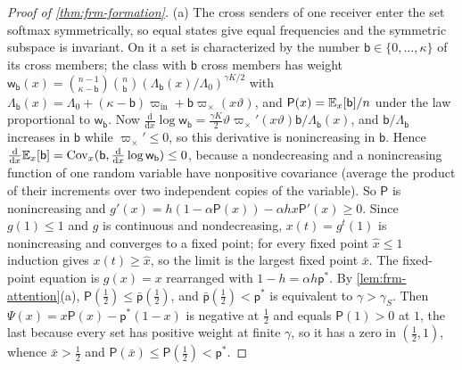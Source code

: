 \begin{proof}[Proof of \cref{thm:frm-formation}]
(a) The cross senders of one receiver enter the set softmax symmetrically, so equal states give equal frequencies and the symmetric subspace is invariant. On it a set is characterized by the number $\mathsf b\in\{0,\dots,\kappa\}$ of its cross members; the class with $\mathsf b$ cross members has weight $\mathsf w_{\mathsf b}(x)=\binom{n-1}{\kappa-\mathsf b}\binom n{\mathsf b}(\Lambda_{\mathsf b}(x)/\Lambda_0)^{\gamma K/2}$ with $\Lambda_{\mathsf b}(x)=\Lambda_0+(\kappa-\mathsf b)\varpi_{\mathrm{in}}+\mathsf b\varpi_\times(x\vartheta)$, and $\mathsf P(x)=\mathbb{E}_x[\mathsf b]/n$ under the law proportional to $\mathsf w_{\mathsf b}$. Now $\frac{\mathrm d}{\mathrm dx}\log\mathsf w_{\mathsf b}=\frac{\gamma K}2\vartheta\varpi_\times'(x\vartheta)\mathsf b/\Lambda_{\mathsf b}(x)$, and $\mathsf b/\Lambda_{\mathsf b}$ increases in $\mathsf b$ while $\varpi_\times'\le0$, so this derivative is nonincreasing in $\mathsf b$. Hence $\frac{\mathrm d}{\mathrm dx}\mathbb{E}_x[\mathsf b]=\operatorname{Cov}_x(\mathsf b,\frac{\mathrm d}{\mathrm dx}\log\mathsf w_{\mathsf b})\le0$, because a nondecreasing and a nonincreasing function of one random variable have nonpositive covariance (average the product of their increments over two independent copies of the variable). So $\mathsf P$ is nonincreasing and $g'(x)=h(1-\alpha\mathsf P(x))-\alpha hx\mathsf P'(x)\ge0$. Since $g(1)\le1$ and $g$ is continuous and nondecreasing, $x(t)=g^t(1)$ is nonincreasing and converges to a fixed point; for every fixed point $\hat x\le1$ induction gives $x(t)\ge\hat x$, so the limit is the largest fixed point $\bar x$. The fixed-point equation is $g(x)=x$ rearranged with $1-h=\alpha h\mathsf p^\ast$. By \cref{lem:frm-attention}(a), $\mathsf P(\frac12)\le\bar{\mathsf p}(\frac12)$, and $\bar{\mathsf p}(\frac12)<\mathsf p^\ast$ is equivalent to $\gamma>\gamma_S$. Then $\Psi(x)=x\mathsf P(x)-\mathsf p^\ast(1-x)$ is negative at $\frac12$ and equals $\mathsf P(1)>0$ at $1$, the last because every set has positive weight at finite $\gamma$, so it has a zero in $(\frac12,1)$, whence $\bar x>\frac12$ and $\mathsf P(\bar x)\le\mathsf P(\frac12)<\mathsf p^\ast$.


\end{proof}
